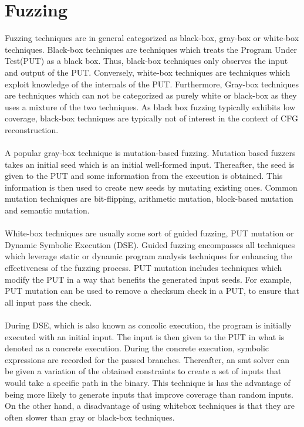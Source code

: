 \documentclass{kththesis}
\begin{document}
\section{Fuzzing}
Fuzzing techniques are in general categorized as black-box, gray-box or white-box techniques\cite{fuzzingSurvey}. Black-box techniques are techniques which treats the Program Under Test(PUT) as a black box. Thus, black-box techniques only observes the input and output of the PUT. Conversely, white-box techniques are techniques which exploit knowledge of the internals of the PUT. Furthermore, Gray-box techniques are techniques which can not be categorized as purely white or black-box as they uses a mixture of the two techniques. As black box fuzzing typically exhibits low coverage, black-box techniques are typically not of interest in the context of CFG reconstruction\cite{fuzzingSurvey}. 
\\ \\
A popular gray-box technique is mutation-based fuzzing. Mutation based fuzzers takes an initial seed which is an initial well-formed input. Thereafter, the seed is given to the PUT and some information from the execution is obtained. This information is then used to create new seeds by mutating existing ones. Common mutation techniques are bit-flipping, arithmetic mutation, block-based mutation and semantic mutation\cite{fuzzingSurvey}.
\\ \\ 
White-box techniques are usually some sort of guided fuzzing, PUT mutation or Dynamic Symbolic Execution (DSE)\cite{fuzzingSurvey}. Guided fuzzing encompasses all techniques which leverage static or dynamic program analysis techniques for enhancing the effectiveness of the fuzzing process. PUT mutation includes techniques which modify the PUT in a way that benefits the generated input seeds. For example, PUT mutation can be used to remove a checksum check in a PUT, to ensure that all input pass the check\cite{fuzzingSurvey}.
\\ \\
During DSE, which is also known as concolic execution, the program is initially executed with an initial input. The input is then given to the PUT in what is denoted as a concrete execution. During the concrete execution, symbolic expressions are recorded for the passed branches. Thereafter, an smt solver can be given a variation of the obtained constraints to create a set of inputs that would take a specific path in the binary. This technique is has the advantage of being more likely to generate inputs that improve coverage than random inputs. On the other hand, a disadvantage of using whitebox techniques is that they are often slower than gray or black-box techniques. 
\end{document}
